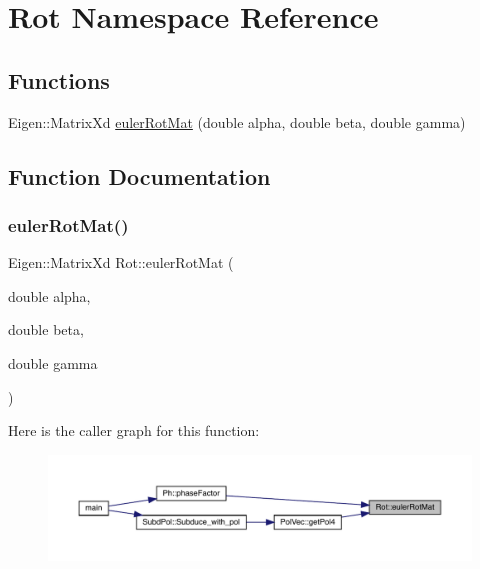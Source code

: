 \hypertarget{namespaceRot}{}\section{Rot Namespace Reference}
\label{namespaceRot}
\subsection*{Functions}
\begin{DoxyCompactItemize}
\item 
Eigen\+::\+Matrix\+Xd \mbox{\hyperlink{namespaceRot_adcd0cec8d1616e5f74d30cb3ad1aca99}{euler\+Rot\+Mat}} (double alpha, double beta, double gamma)
\end{DoxyCompactItemize}


\subsection{Function Documentation}
\mbox{\label{namespaceRot_adcd0cec8d1616e5f74d30cb3ad1aca99}} 
\subsubsection{\texorpdfstring{eulerRotMat()}{eulerRotMat()}}
{\footnotesize\ttfamily Eigen\+::\+Matrix\+Xd Rot\+::euler\+Rot\+Mat (\begin{DoxyParamCaption}\item[{double}]{alpha,  }\item[{double}]{beta,  }\item[{double}]{gamma }\end{DoxyParamCaption})}

Here is the caller graph for this function\+:
\nopagebreak
\begin{figure}[H]
\begin{center}
\leavevmode
\includegraphics[width=350pt]{d7/dcc/namespaceRot_adcd0cec8d1616e5f74d30cb3ad1aca99_icgraph}
\end{center}
\end{figure}
